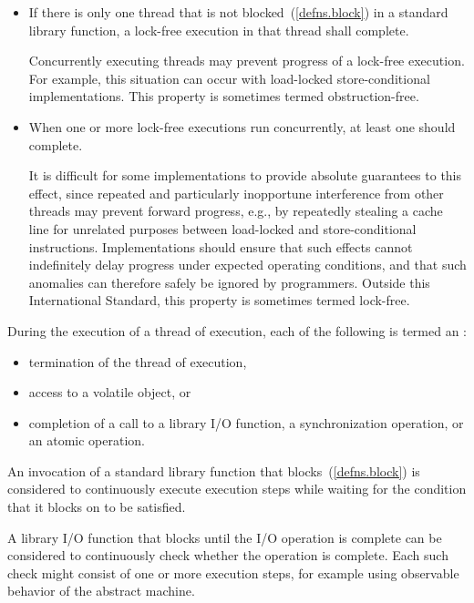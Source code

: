 \begin{itemize}
\item
  If there is only one thread that is not blocked~(\ref{defns.block})
  in a standard library function,
  a lock-free execution in that thread shall complete.
  \begin{note}
    Concurrently executing threads
    may prevent progress of a lock-free execution.
    For example,
    this situation can occur
    with load-locked store-conditional implementations.
    This property is sometimes termed obstruction-free.
  \end{note}
\item
  When one or more lock-free executions run concurrently,
  at least one should complete.
  \begin{note}
    It is difficult for some implementations
    to provide absolute guarantees to this effect,
    since repeated and particularly inopportune interference
    from other threads
    may prevent forward progress,
    e.g.,
    by repeatedly stealing a cache line
    for unrelated purposes
    between load-locked and store-conditional instructions.
    Implementations should ensure
    that such effects cannot indefinitely delay progress
    under expected operating conditions,
    and that such anomalies
    can therefore safely be ignored by programmers.
    Outside this International Standard,
    this property is sometimes termed lock-free.
  \end{note}
\end{itemize}

\pnum
During the execution of a thread of execution, each of the following is termed
an :

\begin{itemize}
\item termination of the thread of execution,
\item access to a volatile object, or
\item completion of a call to a library I/O function, a
      synchronization operation, or an atomic operation.
\end{itemize}

\pnum
An invocation of a standard library function that blocks~(\ref{defns.block})
is considered to continuously execute execution steps while waiting for the
condition that it blocks on to be satisfied.
\begin{example}
A library I/O function that blocks until the I/O operation is complete can
be considered to continuously check whether the operation is complete. Each
such check might consist of one or more execution steps, for example using
observable behavior of the abstract machine.
\end{example}

